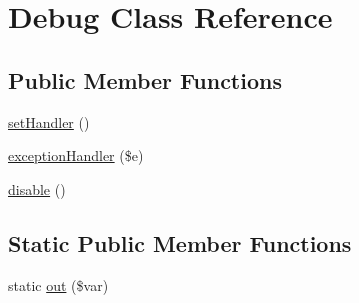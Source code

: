 \hypertarget{class_debug}{\section{Debug Class Reference}
\label{class_debug}
}
\subsection*{Public Member Functions}
\begin{DoxyCompactItemize}
\item 
\hyperlink{class_debug_a475b1cea5652fafc04c94e97ef82fe83}{set\-Handler} ()
\item 
\hyperlink{class_debug_af17dfe92627c634e9450cf38eaef881b}{exception\-Handler} (\$e)
\item 
\hyperlink{class_debug_a545341e59cc9a0dafc4e265d60d4b5d6}{disable} ()
\end{DoxyCompactItemize}
\subsection*{Static Public Member Functions}
\begin{DoxyCompactItemize}
\item 
static \hyperlink{class_debug_aa7753ac7959d9c3b8c719d1724921afd}{out} (\$var)
\end{DoxyCompactItemize}
